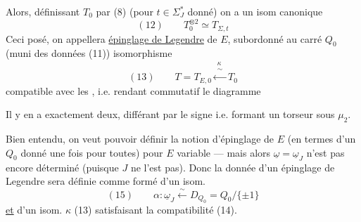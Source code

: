 
Alors, définissant $T_0$ par (8) (pour $t\in\Sigma_J^*$ donné) on a un isom canonique
\[
(12)\qquad T_0^{\otimes2}\simeq T_{\Sigma,t}
\]
Ceci posé, on appellera \uline{épinglage de Legendre}
de $E$, subordonné au carré $Q_0$ (muni des données (11))   isomorphisme
\[
(13)\qquad T=T_{E,0}\xleftarrow{\substack{\kappa\\\sim}}T_0
\]
compatible avec les , i.e. rendant commutatif le diagramme

Il y en a exactement deux, différant par le signe i.e. formant un torseur sous $\mu_2$.

Bien entendu, on veut pouvoir définir la notion d'épinglage de $E$ (en termes d'un $Q_0$ donné une fois pour toutes) pour $E$ variable --- mais alors $\underline\omega=\underline\omega_J$ n'est pas encore déterminé (puisque $J$ ne l'est pas). Donc la donnée d'un épinglage de Legendre sera définie comme  \inserted{$(\alpha,\kappa)$} formé d'un isom.
\[
(15)\qquad\alpha:\underline\omega_J\xleftarrow{\sim}D_{Q_0}=Q_0/\{\pm1\}
\]
\uline{et} d'un isom. $\kappa$ (13) satisfaisant la compatibilité (14).
